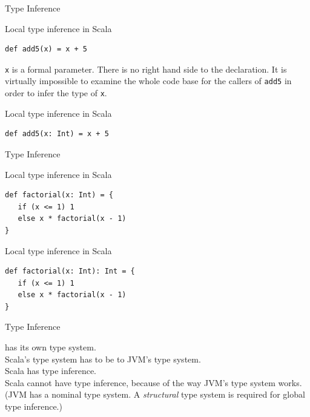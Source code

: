 \begin{frame}[fragile]{Type Inference}
\begin{alertblock}{Local type inference in Scala}
\begin{lstlisting}
def add5(x) = x + 5
\end{lstlisting}
\end{alertblock}
\pause
\lstinline!x! is a formal parameter. There is no right hand side to the
declaration. It is virtually impossible to examine the whole code base for the
callers of \lstinline!add5! in order to infer the type of \lstinline!x!.
\pause
\begin{exampleblock}{Local type inference in Scala}
\begin{lstlisting}
def add5(x: Int) = x + 5
\end{lstlisting}
\end{exampleblock}
\end{frame}

\begin{frame}[fragile]{Type Inference}
\begin{alertblock}{Local type inference in Scala}
\begin{lstlisting}
def factorial(x: Int) = {
   if (x <= 1) 1
   else x * factorial(x - 1)
}
\end{lstlisting}
\end{alertblock}
\pause
\begin{exampleblock}{Local type inference in Scala}
\begin{lstlisting}
def factorial(x: Int): Int = {
   if (x <= 1) 1
   else x * factorial(x - 1)
}
\end{lstlisting}
\end{exampleblock}
\end{frame}

\begin{frame}{Type Inference}
\begin{center}
 has its own type system.\\
Scala's type system has to be  to JVM's type system.\\
Scala has  type inference.\\
Scala \alert{cannot have}  type inference, because of the way
JVM's type system works. (JVM has a \alert{nominal} type system. A \emph{structural} type system
is required for global type inference.)
\end{center}
\end{frame}

